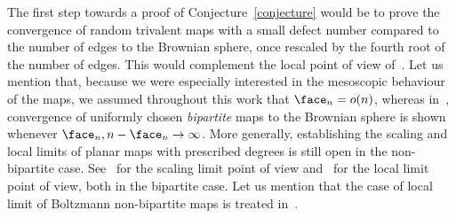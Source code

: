The first step towards a proof of Conjecture~\ref{conjecture} would be to prove the convergence of random trivalent maps with a small defect number compared to the number of edges to the Brownian sphere, once rescaled by the fourth root of the number of edges. This would complement the local point of view of~\cite{Bud21}.
Let us mention that, because we were especially interested in the mesoscopic behaviour of the maps, we assumed throughout this work that $\face_n = o(n)$, whereas in~\cite{KM21b}, convergence of uniformly chosen \emph{bipartite} maps to the Brownian sphere is shown whenever $\face_n, n-\face_n \to \infty$. More generally, establishing the scaling and local limits of planar maps with prescribed degrees is still open in the non-bipartite case. See~\cite{Mar22} for the scaling limit point of view and~\cite{BL22} for the local limit point of view, both in the bipartite case. Let us mention that the case of local limit of Boltzmann non-bipartite maps is treated in~\cite{Ste18}.
